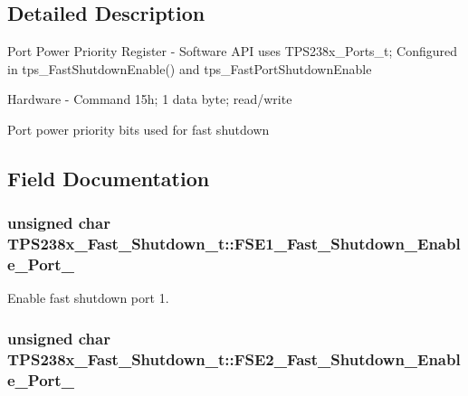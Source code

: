 \subsection{Detailed Description}
Port Power Priority Register -\/ Software A\-P\-I uses T\-P\-S238x\-\_\-\-Ports\-\_\-t; Configured in tps\-\_\-\-Fast\-Shutdown\-Enable() and tps\-\_\-\-Fast\-Port\-Shutdown\-Enable \par
 Hardware -\/ Command 15h; 1 data byte; read/write \par
\par
 Port power priority bits used for fast shutdown 

\subsection{Field Documentation}
\hypertarget{struct_t_p_s238x___fast___shutdown__t_a47baaf5cf4b8f221b848c85209f8aa61}{
\subsubsection[{F\-S\-E1\-\_\-\-Fast\-\_\-\-Shutdown\-\_\-\-Enable\-\_\-\-Port\-\_\-1}]{\setlength{\rightskip}{0pt plus 5cm}unsigned char T\-P\-S238x\-\_\-\-Fast\-\_\-\-Shutdown\-\_\-t\-::\-F\-S\-E1\-\_\-\-Fast\-\_\-\-Shutdown\-\_\-\-Enable\-\_\-\-Port\-\_}}\label{struct_t_p_s238x___fast___shutdown__t_a47baaf5cf4b8f221b848c85209f8aa61}


Enable fast shutdown port 1. 

\hypertarget{struct_t_p_s238x___fast___shutdown__t_a9c9be78fe36df0acd8ac8dc612f1c492}{
\subsubsection[{F\-S\-E2\-\_\-\-Fast\-\_\-\-Shutdown\-\_\-\-Enable\-\_\-\-Port\-\_\-2}]{\setlength{\rightskip}{0pt plus 5cm}unsigned char T\-P\-S238x\-\_\-\-Fast\-\_\-\-Shutdown\-\_\-t\-::\-F\-S\-E2\-\_\-\-Fast\-\_\-\-Shutdown\-\_\-\-Enable\-\_\-\-Port\-\_}}\label{struct_t_p_s238x___fast___shutdown__t_a9c9be78fe36df0acd8ac8dc612f1c492}


